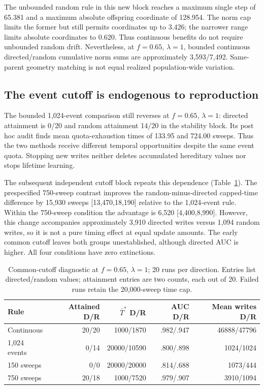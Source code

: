 \documentclass[11pt]{article}
\begin{document}
The unbounded random rule in this new block reaches a maximum single step of 65.381 and a maximum absolute offspring coordinate of 128.954. The norm cap limits the former but still permits coordinates up to 3.426; the narrower range limits absolute coordinates to 0.620. Thus continuous benefits do not require unbounded random drift. Nevertheless, at $f=0.65$, $\lambda=1$, bounded continuous directed/random cumulative norm sums are approximately 3,593/7,492. Same-parent geometry matching is not equal realized population-wide variation.

\subsection{The event cutoff is endogenous to reproduction}
The bounded 1,024-event comparison still reverses at $f=0.65$, $\lambda=1$: directed attainment is 0/20 and random attainment 14/20 in the stability block. Its post hoc audit finds mean quota-exhaustion times of 133.95 and 724.00 sweeps. Thus the two methods receive different temporal opportunities despite the same event quota. Stopping new writes neither deletes accumulated hereditary values nor stops lifetime learning.

The subsequent independent cutoff block repeats this dependence (Table~\ref{tab:cutoff}). The prespecified 750-sweep contrast improves the random-minus-directed capped-time difference by 15,930 sweeps [13,470,18,190] relative to the 1,024-event rule. Within the 750-sweep condition the advantage is 6,520 [4,400,8,990]. However, this change accompanies approximately 3,910 directed writes versus 1,094 random writes, so it is not a pure timing effect at equal update amounts. The early common cutoff leaves both groups unestablished, although directed AUC is higher. All four conditions have zero extinctions.

\begin{table}[htbp]\centering\small
\caption{Common-cutoff diagnostic at $f=0.65$, $\lambda=1$; 20 runs per direction. Entries list directed/random values; attainment entries are two counts, each out of 20. Failed runs retain the 20,000-sweep time cap.}\label{tab:cutoff}
\begin{tabular}{lrrrr}\toprule
Rule & Attained D/R & $\bar T^*$ D/R & AUC D/R & Mean writes D/R\\\midrule
Continuous & 20/20 & 1000/1870 & .982/.947 & 46888/47796\\
1,024 events & 0/14 & 20000/10590 & .800/.898 & 1024/1024\\
150 sweeps & 0/0 & 20000/20000 & .814/.688 & 1073/444\\
750 sweeps & 20/18 & 1000/7520 & .979/.907 & 3910/1094\\\bottomrule
\end{tabular}
\end{table}
\end{document}
